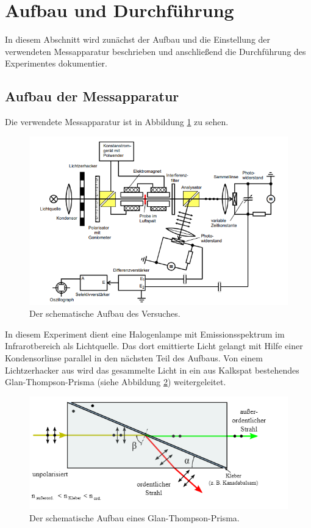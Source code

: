 \section{Aufbau und Durchführung}
\label{sec:Durchführung}
In diesem Abschnitt wird zunächst der Aufbau und die Einstellung der verwendeten Messapparatur beschrieben und anschließend die Durchführung des Experimentes dokumentier.
\subsection{Aufbau der Messapparatur}
\label{sec:aufbau}
Die verwendete Messapparatur ist in Abbildung \ref{fig:messapp} zu sehen.
\begin{figure}[h]
  \centering
  \includegraphics[scale=0.5]{fig/messapp.png}
  \caption{Der schematische Aufbau des Versuches. \cite[2]{Anleitung2}}
  \label{fig:messapp}
\end{figure}
In diesem Experiment dient eine Halogenlampe mit Emissionsspektrum im Infrarotbereich als Lichtquelle. Das dort emittierte Licht gelangt mit Hilfe einer Kondensorlinse parallel in den nächsten Teil des Aufbaus. Von einem Lichtzerhacker aus wird das gesammelte Licht in ein aus Kalkspat bestehendes Glan-Thompson-Prisma (siehe Abbildung \ref{fig:glan}) weitergeleitet.
\begin{figure}[h!]
  \centering
  \includegraphics[scale=0.5]{fig/glan.png}
  \caption{Der schematische Aufbau eines Glan-Thompson-Prisma. \cite{Anleitung3}}
  \label{fig:glan}
\end{figure}
